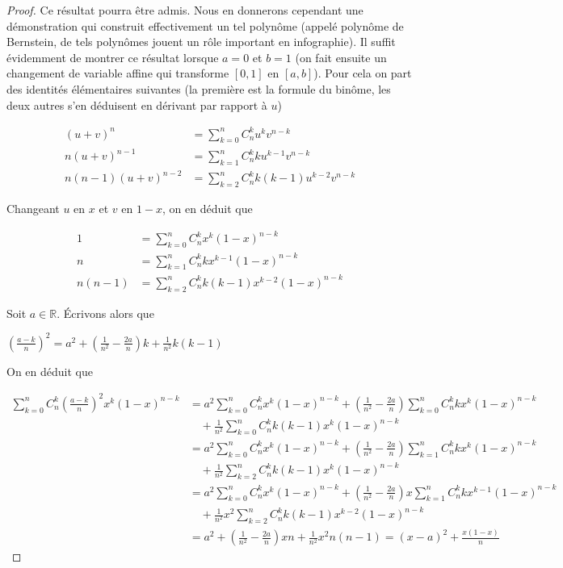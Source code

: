 \begin{proof}
Ce résultat pourra être admis. Nous en donnerons cependant une démonstration qui construit effectivement un tel polynôme (appelé polynôme de Bernstein, de tels polynômes jouent un rôle important en infographie). Il suffit évidemment de montrer ce résultat lorsque $a = 0$ et $b = 1$ (on fait ensuite un changement de variable affine qui transforme $[0,1]$ en $[a,b]$). Pour cela on part des identités élémentaires suivantes (la première est la formule du binôme, les deux autres s'en déduisent en dérivant par rapport à $u$)

\begin{align*}
(u + v)^n &= \sum_{k=0}^n C_n^k u^k v^{n-k} \\
n(u + v)^{n-1} &= \sum_{k=1}^n C_n^k k u^{k-1} v^{n-k} \\
n(n - 1)(u + v)^{n-2} &= \sum_{k=2}^n C_n^k k(k - 1) u^{k-2} v^{n-k}
\end{align*}

Changeant $u$ en $x$ et $v$ en $1 - x$, on en déduit que

\begin{align*}
1 &= \sum_{k=0}^n C_n^k x^k (1 - x)^{n-k} \\
n &= \sum_{k=1}^n C_n^k k x^{k-1} (1 - x)^{n-k} \\
n(n - 1) &= \sum_{k=2}^n C_n^k k(k - 1) x^{k-2} (1 - x)^{n-k}
\end{align*}

Soit $a \in \mathbb{R}$. Écrivons alors que

$\left(\frac{a - k}{n}\right)^2 = a^2 + (\frac{1}{n^2} - \frac{2a}{n})k + \frac{1}{n^2}k(k - 1)$

On en déduit que

\begin{align*}
\sum_{k=0}^n C_n^k \left(\frac{a - k}{n}\right)^2 x^k (1 - x)^{n-k} &= a^2 \sum_{k=0}^n C_n^k x^k (1 - x)^{n-k} + (\frac{1}{n^2} - \frac{2a}{n}) \sum_{k=0}^n C_n^k k x^k (1 - x)^{n-k} \\
&\quad + \frac{1}{n^2} \sum_{k=0}^n C_n^k k(k - 1) x^k (1 - x)^{n-k} \\
&= a^2 \sum_{k=0}^n C_n^k x^k (1 - x)^{n-k} + (\frac{1}{n^2} - \frac{2a}{n}) \sum_{k=1}^n C_n^k k x^k (1 - x)^{n-k} \\
&\quad + \frac{1}{n^2} \sum_{k=2}^n C_n^k k(k - 1) x^k (1 - x)^{n-k} \\
&= a^2 \sum_{k=0}^n C_n^k x^k (1 - x)^{n-k} + (\frac{1}{n^2} - \frac{2a}{n}) x \sum_{k=1}^n C_n^k k x^{k-1} (1 - x)^{n-k} \\
&\quad + \frac{1}{n^2} x^2 \sum_{k=2}^n C_n^k k(k - 1) x^{k-2} (1 - x)^{n-k} \\
&= a^2 + (\frac{1}{n^2} - \frac{2a}{n}) x n + \frac{1}{n^2} x^2 n(n - 1) = (x - a)^2 + \frac{x(1 - x)}{n}
\end{align*}


\end{proof}
